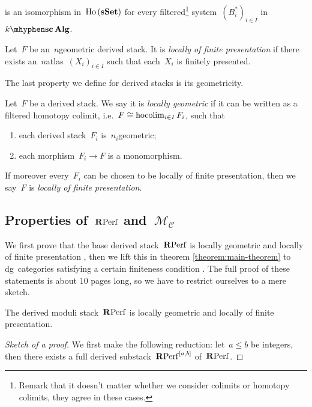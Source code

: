 \begin{refsection}
\begin{definition}
\begin{equation}
  \end{equation}
  is an isomorphism in~$\operatorname{\mathrm{Ho} \,}(\mathbf{s\,\!\mathbf{Set}})$ for every filtered\footnote{Remark that it doesn't matter whether we consider colimits or homotopy colimits, they agree in these cases.} system~$(B_i^*)_{i\in I}$ in~$\scAlg{k}$.
\end{definition}
\begin{definition}
  Let~$F$ be an~$n$\dash geometric derived stack. It is \emph{locally of finite presentation} if there exists an~$n$\dash atlas~$(X_i)_{i\in I}$ such that each~$X_i$ is finitely presented.
\end{definition}
The last property we define for derived stacks is its geometricity.
\begin{definition}
  Let~$F$ be a derived stack. We say it is \emph{locally geometric} if it can be written as a filtered homotopy colimit, i.e.\ $F\cong\operatorname*{hocolim}_{i\in I}F_i$, such that
  \begin{enumerate}
    \item each derived stack~$F_i$ is~$n_i$\dash geometric;
    \item each morphism~$F_i\to F$ is a monomorphism.
  \end{enumerate}
  If moreover every~$F_i$ can be chosen to be locally of finite presentation, then we say~$F$ is \emph{locally of finite presentation}.
\end{definition}

\subsection{Properties of~$\mathbf{R}\mathrm{Perf}$ and~$\mathcal{M}_{\mathcal{C}}$}
We first prove that the base derived stack~$\mathbf{R}\mathrm{Perf}$ is locally geometric and locally of finite presentation \cite[proposition 3.7]{toen-vaquie-moduli-of-objects-in-dg-categories}, then we lift this in theorem \ref{theorem:main-theorem} to dg~categories satisfying a certain finiteness condition \cite[theorem 3.6]{toen-vaquie-moduli-of-objects-in-dg-categories}. The full proof of these statements is about 10 pages long, so we have to restrict ourselves to a mere sketch.
\begin{theorem}
  \label{theorem:main-theorem-RPerf}
  The derived moduli stack~$\mathbf{R}\mathrm{Perf}$ is locally geometric and locally of finite presentation.

  \begin{proof}[Sketch of a proof]
    We first make the following reduction: let~$a\leq b$ be integers, then there exists a full derived substack~$\mathbf{R}\mathrm{Perf}^{[a,b]}$ of~$\mathbf{R}\mathrm{Perf}$.
    

\end{proof}
\end{theorem}
\end{refsection}
